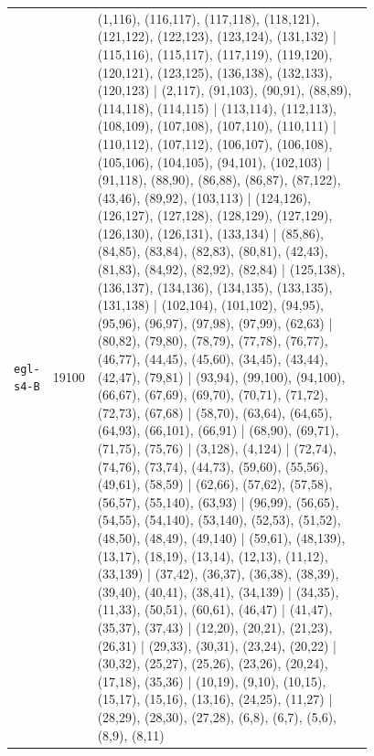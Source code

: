 \begin{landscape}
\begin{longtable}{lr>{\tiny\raggedright\arraybackslash}p{0.78\linewidth}}
\texttt{egl-s4-B} & 19100 & (1,116), (116,117), (117,118), (118,121), (121,122), (122,123), (123,124), (131,132) | (115,116), (115,117), (117,119), (119,120), (120,121), (123,125), (136,138), (132,133), (120,123) | (2,117), (91,103), (90,91), (88,89), (114,118), (114,115) | (113,114), (112,113), (108,109), (107,108), (107,110), (110,111) | (110,112), (107,112), (106,107), (106,108), (105,106), (104,105), (94,101), (102,103) | (91,118), (88,90), (86,88), (86,87), (87,122), (43,46), (89,92), (103,113) | (124,126), (126,127), (127,128), (128,129), (127,129), (126,130), (126,131), (133,134) | (85,86), (84,85), (83,84), (82,83), (80,81), (42,43), (81,83), (84,92), (82,92), (82,84) | (125,138), (136,137), (134,136), (134,135), (133,135), (131,138) | (102,104), (101,102), (94,95), (95,96), (96,97), (97,98), (97,99), (62,63) | (80,82), (79,80), (78,79), (77,78), (76,77), (46,77), (44,45), (45,60), (34,45), (43,44), (42,47), (79,81) | (93,94), (99,100), (94,100), (66,67), (67,69), (69,70), (70,71), (71,72), (72,73), (67,68) | (58,70), (63,64), (64,65), (64,93), (66,101), (66,91) | (68,90), (69,71), (71,75), (75,76) | (3,128), (4,124) | (72,74), (74,76), (73,74), (44,73), (59,60), (55,56), (49,61), (58,59) | (62,66), (57,62), (57,58), (56,57), (55,140), (63,93) | (96,99), (56,65), (54,55), (54,140), (53,140), (52,53), (51,52), (48,50), (48,49), (49,140) | (59,61), (48,139), (13,17), (18,19), (13,14), (12,13), (11,12), (33,139) | (37,42), (36,37), (36,38), (38,39), (39,40), (40,41), (38,41), (34,139) | (34,35), (11,33), (50,51), (60,61), (46,47) | (41,47), (35,37), (37,43) | (12,20), (20,21), (21,23), (26,31) | (29,33), (30,31), (23,24), (20,22) | (30,32), (25,27), (25,26), (23,26), (20,24), (17,18), (35,36) | (10,19), (9,10), (10,15), (15,17), (15,16), (13,16), (24,25), (11,27) | (28,29), (28,30), (27,28), (6,8), (6,7), (5,6), (8,9), (8,11) \\[2pt]

\end{longtable}
\end{landscape}
